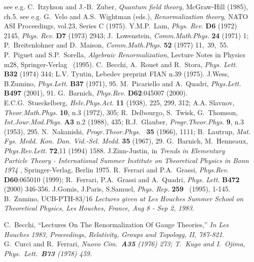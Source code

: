 \documentclass[a4paper,11pt]{article}
\begin{document}
\begin{thebibliography}{99}
\small
{}
        {see e.g. C.~Itzykson and J.-B.~Zuber, {\em Quantum field theory}, 
         McGraw-Hill (1985), ch.5.}
        {see e.g. G.~Velo and A.S.~Wightman (eds.), {\em Renormalization
        theory}, NATO ASI Proceedings, vol.23, Series C (1975).}
        Y.M.P.~Lam, {\em Phys. Rev.} {\bf D6 } (1972) 2145, 
        {\em Phys. Rev. } {\bf D7} (1973) 2943; J.~Lowenstein, 
        {\em Comm.Math.Phys. } {\bf 24} (1971) 1; 
        P.~Breitenlohner and D.~Maison, 
        {\em Comm.Math.Phys. } {\bf 52} (1977) 11,~39,~55.  
        {P.~Piguet and S.P.~Sorella, {\it
        Algebraic Renormalization}, Lecture Notes in Physics m28,
        Springer-Verlag~ (1995)}.
        C.~Becchi, A.~Rouet and R.~Stora, {\em Phys. Lett. } {\bf B32} 
        (1974) 344; L.V. Tyutin, Lebedev preprint FIAN n.39 (1975).
       J.Wess, B.Zumino, {\em Phys.Lett. } {\bf B37} (1971), 95.
        M.~Picariello and A.~Quadri, {\em Phys.Lett. } {\bf B497 } (2001), 91. 
        G.~Barnich, {\em Phys.Rev.} {\bf D62}:045007 (2000).
     E.C.G.~Stueckelberg, {\em Helv.Phys.Act.} {\bf 11} (1938),
        225, 299, 312; A.A. Slavnov, 
        {\em Theor.Math.Phys.} {\bf 10}, n.3 (1972), 305; 
        R.~Delbourgo, S.~Twisk, G.~Thomson,
        {\em Int.Jour.Mod.Phys.} {\bf A3} n.2 (1988), 435;
        R.J.~Glauber, {\em Progr.Theor.Phys.} {\bf 9}, n.3 (1953), 295.
     N.~Nakanishi, {\em Progr.Theor.Phys.} \ {\bf 35 } (1966), 1111;
     B.~Lautrup, {\em Mat. Fys. Medd. Kon. Dan. Vid.-Sel. Medd. } {\bf 35}
     (1967), 29.
    G.~Barnich, M.~Henneaux, {\em Phys.Rev.Lett. } {\bf 72},11 (1994) 1588.
       J.Zinn-Justin, in {\em Trends in Elementary Particle Theory -
        International Summer Institute on Theoretical Physics in Bonn 1974 }, 
        Springer-Verlag, Berlin 1975.
         {R.~Ferrari and P.A.~Grassi,
        {\em Phys.Rev. } {\bf D60}:065010 (1999)};
        {R.~Ferrari, P.A.~Grassi and A.~Quadri, 
         {\em Phys. Lett.} {\bf B472} (2000) 346-356.}
        {J.Gomis, J.Paris, S.Samuel, {\em Phys. Rep. } {\bf 259} 
         \ (1995), 1-145}.
B.~Zumino,
UCB-PTH-83/16
{\it Lectures given at Les Houches Summer School on Theoretical
Physics, Les Houches, France, Aug 8 - Sep 2, 1983}.

        C.~Becchi,
``Lectures On The Renormalization Of Gauge Theories,''
{\it  In Les Houches 1983, Proceedings, Relativity, Groups and Topology, II, 787-821}.
G.~Curci and R.~Ferrari,
\em Nuovo Cim.\ \rm {\bf A35} (1976) 273;
T.~Kugo and I.~Ojima,
\em Phys.\ Lett.\ \rm {\bf B73} (1978) 459.

\end{thebibliography}
\end{document}
